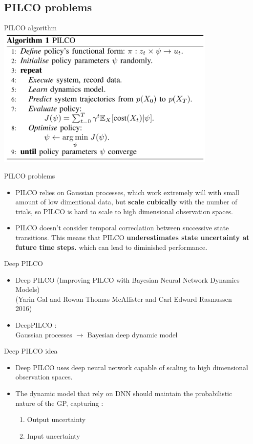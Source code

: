 \documentclass{beamer}
\begin{document}
\subsection{PILCO problems}
\begin{frame}{PILCO algorithm}
\includegraphics[height=7cm]{img/pilco-algo.png}
\end{frame}
\begin{frame}{PILCO problems}
    \begin{itemize}
        \item PILCO relies on Gaussian processes, which work extremely will with small amount of low dimentional data, but \textbf{scale cubically} with the number of trials, so PILCO is hard to scale to high dimensional observation spaces.
        \item PILCO doesn't consider temporal correclation between successive state transitions. This means that PILCO \textbf{underestimates state uncertainty at future time steps.} which can lead to diminished performance.
    \end{itemize}
\end{frame}
\begin{frame}{Deep PILCO}
    \begin{itemize}
        \item Deep PILCO (Improving  PILCO  with  Bayesian  Neural  Network  Dynamics  Models)\\
        (Yarin Gal and Rowan Thomas McAllister and Carl Edward Rasmussen - 2016)
        \item DeepPILCO : \\
        Gaussian processes $\rightarrow$ Bayesian deep dynamic model
    \end{itemize}
\end{frame}
\begin{frame}{Deep PILCO idea}
\begin{itemize}
    \item Deep PILCO uses deep neural network capable of scaling to high dimensional observation spaces.
    \item The dynamic model that rely on DNN should maintain the probabilistic nature of the GP, capturing :
    \begin{enumerate}
        \item Output uncertainty
        \item Input uncertainty
    \end{enumerate}
\end{itemize}
\end{frame}
\end{document}
